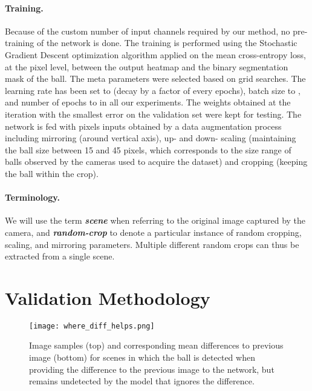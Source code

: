 \documentclass[sigconf, screen]{acmart}
\begin{document}
\paragraph{Training.}
Because of the custom number of input channels required by our method, no pre-training of the network is done.
The training is performed using the Stochastic Gradient Descent optimization algorithm applied on the mean cross-entropy loss, at the pixel level, between the output heatmap and the binary segmentation mask of the ball.
The meta parameters were selected based on grid searches. The learning rate has been set to  (decay by a factor of  every  epochs), batch size to , and number of epochs to  in all our experiments. The weights obtained at the iteration with the smallest error on the validation set were kept for testing.
The network is fed with  pixels inputs obtained by a data augmentation process including mirroring (around vertical axis), up- and down- scaling (maintaining the ball size between 15 and 45 pixels, which corresponds to the size range of balls observed by the cameras used to acquire the dataset) and cropping (keeping the ball within the crop).

\paragraph{Terminology.}
We will use the term \emph{\bf scene} when referring to the original image captured by the camera, and \emph{\bf random-crop} to denote a particular instance of random cropping, scaling, and mirroring parameters. Multiple different random crops can thus be extracted from a single scene.





\section{Validation Methodology}
\label{sec:validation}

\begin{figure*}
    \begin{center}
    \texttt{[image: where\_diff\_helps.png]}
    \end{center}
    \vspace{-0.5em}
    \caption{Image samples (top) and corresponding mean differences to previous image (bottom) for scenes in which the ball is detected when providing the difference to the previous image to the network, but remains undetected by the model that ignores the difference.}
    \label{fig:where_diff_helps}
\end{figure*}
\end{document}
